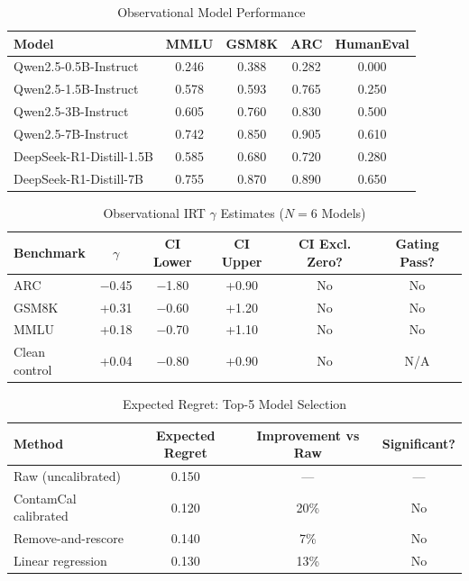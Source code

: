 \documentclass[11pt]{article}
\begin{document}
\begin{table}[h]
\centering
\caption{Observational Model Performance}
\label{tab:obs_perf}
\begin{tabular}{lcccc}
\toprule
Model & MMLU & GSM8K & ARC & HumanEval \\
\midrule
Qwen2.5-0.5B-Instruct & 0.246 & 0.388 & 0.282 & 0.000 \\
Qwen2.5-1.5B-Instruct & 0.578 & 0.593 & 0.765 & 0.250 \\
Qwen2.5-3B-Instruct & 0.605 & 0.760 & 0.830 & 0.500 \\
Qwen2.5-7B-Instruct & 0.742 & 0.850 & 0.905 & 0.610 \\
DeepSeek-R1-Distill-1.5B & 0.585 & 0.680 & 0.720 & 0.280 \\
DeepSeek-R1-Distill-7B & 0.755 & 0.870 & 0.890 & 0.650 \\
\bottomrule
\end{tabular}
\end{table}

\begin{table}[h]
\centering
\caption{Observational IRT $\gamma$ Estimates ($N=6$ Models)}
\label{tab:obs_gamma}
\begin{tabular}{lccccc}
\toprule
Benchmark & $\gamma$ & CI Lower & CI Upper & CI Excl. Zero? & Gating Pass? \\
\midrule
ARC & $-$0.45 & $-$1.80 & +0.90 & No & No \\
GSM8K & +0.31 & $-$0.60 & +1.20 & No & No \\
MMLU & +0.18 & $-$0.70 & +1.10 & No & No \\
Clean control & +0.04 & $-$0.80 & +0.90 & No & N/A \\
\bottomrule
\end{tabular}
\end{table}

\begin{table}[h]
\centering
\caption{Expected Regret: Top-5 Model Selection}
\label{tab:regret}
\begin{tabular}{lccc}
\toprule
Method & Expected Regret & Improvement vs Raw & Significant? \\
\midrule
Raw (uncalibrated) & 0.150 & --- & --- \\
ContamCal calibrated & 0.120 & 20\% & No \\
Remove-and-rescore & 0.140 & 7\% & No \\
Linear regression & 0.130 & 13\% & No \\
\bottomrule
\end{tabular}
\end{table}
\end{document}
